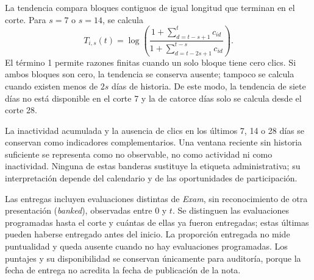 La tendencia compara bloques contiguos de igual longitud que terminan en el corte. Para $s=7$ o $s=14$, se calcula
\[
T_{i,s}(t)=\log\!\left(\frac{1+\sum_{d=t-s+1}^{t}c_{id}}
{1+\sum_{d=t-2s+1}^{t-s}c_{id}}\right).
\]
El término 1 permite razones finitas cuando un solo bloque tiene cero clics. Si ambos bloques son cero, la tendencia se conserva ausente; tampoco se calcula cuando existen menos de $2s$ días de historia. De este modo, la tendencia de siete días no está disponible en el corte 7 y la de catorce días solo se calcula desde el corte 28.

La inactividad acumulada y la ausencia de clics en los últimos 7, 14 o 28 días se conservan como indicadores complementarios. Una ventana reciente sin historia suficiente se representa como no observable, no como actividad ni como inactividad. Ninguna de estas banderas sustituye la etiqueta administrativa; su interpretación depende del calendario y de las oportunidades de participación.

Las entregas incluyen evaluaciones distintas de \textit{Exam}, sin reconocimiento de otra presentación (\textit{banked}), observadas entre 0 y $t$. Se distinguen las evaluaciones programadas hasta el corte y cuántas de ellas ya fueron entregadas; estas últimas pueden haberse entregado antes del inicio. La proporción entregada no mide puntualidad y queda ausente cuando no hay evaluaciones programadas. Los puntajes y su disponibilidad se conservan únicamente para auditoría, porque la fecha de entrega no acredita la fecha de publicación de la nota.

